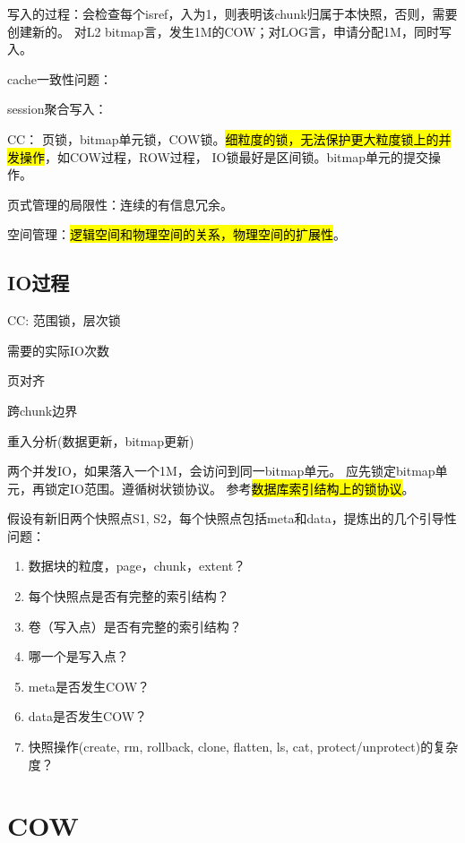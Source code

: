 写入的过程：会检查每个isref，入为1，则表明该chunk归属于本快照，否则，需要创建新的。
对L2 bitmap言，发生1M的COW；对LOG言，申请分配1M，同时写入。

cache一致性问题：

session聚合写入：

CC： 页锁，bitmap单元锁，COW锁。\hl{细粒度的锁，无法保护更大粒度锁上的并发操作}，如COW过程，ROW过程，
IO锁最好是区间锁。bitmap单元的提交操作。

页式管理的局限性：连续的有信息冗余。

空间管理：\hl{逻辑空间和物理空间的关系，物理空间的扩展性}。

\subsection{IO过程}

\begin{itembox}
\item CC: 范围锁，层次锁
\item 需要的实际IO次数
\item 页对齐
\item 跨chunk边界
\item 重入分析(数据更新，bitmap更新)
\end{itembox}

两个并发IO，如果落入一个1M，会访问到同一bitmap单元。
应先锁定bitmap单元，再锁定IO范围。遵循树状锁协议。
参考\hl{数据库索引结构上的锁协议}。

\begin{tcolorbox}

假设有新旧两个快照点S1, S2，每个快照点包括meta和data，提炼出的几个引导性问题：

\begin{enumerate}
    \item 数据块的粒度，page，chunk，extent？
    \item 每个快照点是否有完整的索引结构？
    \item 卷（写入点）是否有完整的索引结构？
    \item 哪一个是写入点？
    \item meta是否发生COW？
    \item data是否发生COW？
    \item 快照操作(create, rm, rollback, clone, flatten, ls, cat, protect/unprotect)的复杂度？
\end{enumerate}

\end{tcolorbox}

\section{COW}

